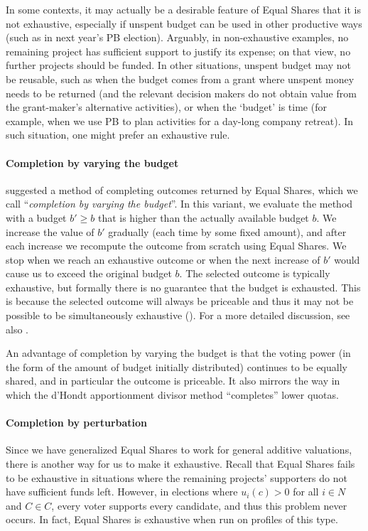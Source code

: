\documentclass[10pt]{scrartcl}
\renewcommand*{\ge}{\geqslant}
\theoremstyle{definition}
\theoremstyle{plain}
\begin{document}
In some contexts, it may actually be a desirable feature of Equal Shares that it is not exhaustive, especially if unspent budget can be used in other productive ways (such as in next year's PB election). Arguably, in non-exhaustive examples, no remaining project has sufficient support to justify its expense; on that view, no further projects should be funded. In other situations, unspent budget may not be reusable, such as when the budget comes from a grant where unspent money needs to be returned (and the relevant decision makers do not obtain value from the grant-maker's alternative activities), or when the `budget' is time (for example, when we use PB to plan activities for a day-long company retreat). In such situation, one might prefer an exhaustive rule.

\paragraph{Completion by varying the budget}
\citet{pet-pie-sha-sko:stable-priceability} suggested a method of completing outcomes returned by Equal Shares, which we call ``\emph{completion by varying the budget}''. In this variant, we evaluate the method with a budget $b' \ge b$ that is higher than the actually available budget $b$. We increase the value of $b'$ gradually (each time by some fixed amount), and after each increase we recompute the outcome from scratch using Equal Shares. We stop when we reach an exhaustive outcome or when the next increase of $b'$ would cause us to exceed the original budget $b$. The selected outcome is typically exhaustive, but formally there is no guarantee that the budget is exhausted. This is because the selected outcome will always be priceable and thus it may not be possible to be simultaneously exhaustive (). For a  more detailed discussion, see also \citet{pet-pie-sha-sko:stable-priceability}.

An advantage of completion by varying the budget is that the voting power (in the form of the amount of budget initially distributed) continues to be equally shared, and in particular the outcome is priceable.
It also mirrors the way in which the d'Hondt apportionment divisor method ``completes'' lower quotas.



\paragraph{Completion by perturbation}
Since we have generalized Equal Shares to work for general additive valuations, there is another way for us to make it exhaustive. Recall that Equal Shares fails to be exhaustive in situations where the remaining projects' supporters do not have sufficient funds left. However, in elections where $u_i(c) > 0$ for all $i \in N$ and $C\in C$, every voter supports every candidate, and thus this problem never occurs. In fact, Equal Shares is exhaustive when run on profiles of this type.
\end{document}
